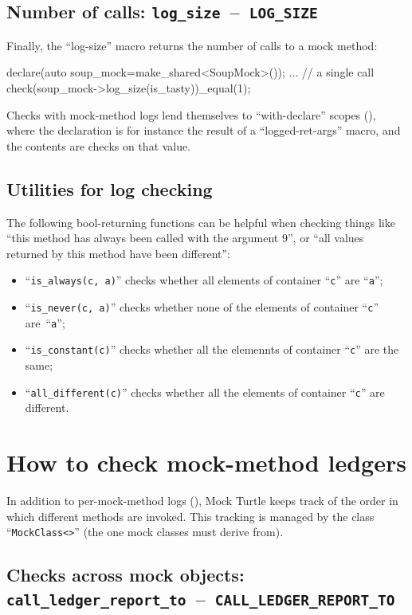 \documentclass[twoside, a4paper, article]{memoir}
\newcommand*\testudocolor{\color{red!80!blue}}
\newcommand*\testudo[1]{\texttt{\testudocolor{}#1}}
\newcommand*\testudopair[2]{\testudo{#1}~--~\testudo{#2}}
\newcommand\subsectiontestudopair[3]{%
  \subsection[#1]{#1: \testudopair{#2}{#3}}}
\begin{document}
\subsectiontestudopair{Number of calls}{log\_size}{LOG\_SIZE}

Finally, the ``log-size'' macro returns the number of calls to a mock method:
\begin{cpplisting}
declare(auto soup_mock=make_shared<SoupMock>());
...
// a single call
check(soup_mock->log_size(is_tasty))_equal(1);
\end{cpplisting}

Checks with mock-method logs lend themselves to ``with-declare'' scopes
(), where the declaration is for instance the
result of a ``logged-ret-args'' macro, and the contents are checks on that
value.

\subsection{Utilities for log checking}
\label{sec:utilities-log-checking}

The following bool-returning functions can be helpful when checking things like
``this method has always been called with the argument $9$'', or ``all values
returned by this method have been different'':
\begin{itemize}
\item ``\texttt{is\_always(c, a)}'' checks whether all elements of container
  ``\texttt{c}'' are ``\texttt{a}'';
\item ``\texttt{is\_never(c, a)}'' checks whether none of the elements of
  container ``\texttt{c}'' are~``\texttt{a}'';
\item ``\texttt{is\_constant(c)}'' checks whether all the elemennts of
  container ``\texttt{c}'' are the same;
\item ``\texttt{all\_different(c)}'' checks whether all the elements of
  container ``\texttt{c}'' are different.
\end{itemize}

\section{How to check mock-method ledgers}
\label{sec:check-mock-method-ledgers}

In addition to per-mock-method logs (), Mock
Turtle keeps track of the order in which different methods are invoked.  This
tracking is managed by the class ``\texttt{MockClass<>}'' (the one
mock classes must derive from).

\subsectiontestudopair{Checks across mock objects}%
  {call\_ledger\_report\_to}{CALL\_LEDGER\_REPORT\_TO}
\label{sec:check-mock-method-ledgers-across-mock-objects}
\end{document}
